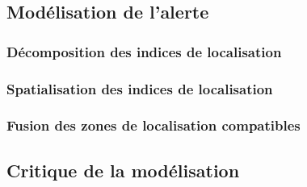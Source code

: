 \subsection{Modélisation de l'alerte}
\label{subsec:9-3-2}

\subsubsection{Décomposition des indices de localisation}
\label{subsec:9-3-2-2}

\subsubsection{Spatialisation des indices de localisation}
\label{subsec:9-3-2-3}

\subsubsection{Fusion des zones de localisation compatibles}
\label{subsec:9-3-2-4}

\subsection{Critique de la modélisation}
\label{subsec:9-3-3}


